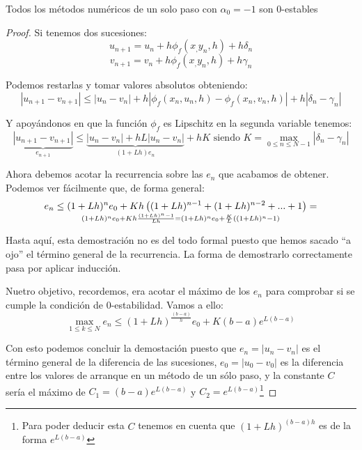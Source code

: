 \begin{prop}
Todos los métodos numéricos de un solo paso con $α_0=-1$ son 0-estables
\end{prop}
\begin{proof}
Si tenemos dos sucesiones:
\[u_{n+1}=u_n+h\phi_f(x_,y_n,h)+hδ_n\]
\[v_{n+1}=v_n+h\phi_f(x_,y_n,h)+hγ_n\]

Podemos restarlas y tomar valores absolutos obteniendo:
\[|u_{n+1}-v_{n+1}|\leq |u_n-v_n| + h |\phi_f(x_n,u_n,h)-\phi_f(x_n,v_n,h)|+h|δ_n-γ_n|\]

Y apoyándonos en que la función $\phi_f$ es Lipschitz en la segunda variable tenemos:
\[\underbrace{|u_{n+1}-v_{n+1}|}_{e_{n+1}}\leq \underbrace{|u_n-v_n| + hL|u_n-v_n|}_{(1+Lh)e_n}+hK \text{ siendo } K=\max_{0 \leq n \leq N-1}|δ_n-γ_n|\]

Ahora debemos acotar la recurrencia sobre las $e_n$ que acabamos de obtener. Podemos ver fácilmente que, de forma general:
\[e_n \leq (1+Lh)^ne_0+Kh\left( (1+Lh)^{n-1}+(1+Lh)^{n-2}+...+1\right)=\atop (1+Lh)^ne_0+Kh\frac{(1+Lh)^n-1}{Lh}=(1+Lh)^ne_0+\frac{K}{L}((1+Lh)^n-1)\]

\obs Hasta aquí, esta demostración no es del todo formal puesto que hemos sacado ``a ojo'' el término general de la recurrencia. La forma de demostrarlo correctamente pasa por aplicar inducción.

Nuetro objetivo, recordemos, era acotar el máximo de los $e_n$ para comprobar si se cumple la condición de 0-estabilidad. Vamos a ello:
\[\max_{1\leq k \leq N}e_n \leq (1+Lh)^{\frac{(b-a)}{h}}e_0 + K(b-a)e^{L(b-a)}\]

Con esto podemos concluir la demostación puesto que $e_n=|u_n-v_n|$ es el término general de la diferencia de las sucesiones, $e_0=|u_0-v_0|$ es la diferencia entre los valores de arranque en un método de un sólo paso, y la constante $C$ sería el máximo de $C_1=(b-a)e^{L(b-a)}$ y $C_2=e^{L(b-a)}$\footnote{Para poder deducir esta $C$ tenemos en cuenta que $(1+Lh)^{(b-a)h}$ es de la forma $e^{L(b-a)}$}
\end{proof}

